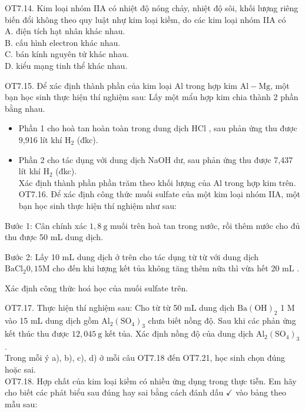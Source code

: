 \documentclass[10pt]{article}
\begin{document}
OT7.14. Kim loại nhóm IIA có nhiệt độ nóng chảy, nhiệt độ sôi, khối lượng riêng biến đổi không theo quy luật nhự kim loại kiềm, do các kim loại nhóm IIA có\\
A. điện tích hạt nhân khác nhau.\\
B. cấu hình electron khác nhau.\\
C. bán kính nguyên tử khác nhau.\\
D. kiểu mạng tinh thể khác nhau.

OT7.15. Để xác định thành phần của kim loại Al trong hợp kim $\mathrm{Al}-\mathrm{Mg}$, một bạn học sinh thực hiện thí nghiệm sau: Lấy một mẩu hợp kim chia thành 2 phần bằng nhau.

\begin{itemize}
  \item Phần 1 cho hoà tan hoàn toàn trong dung dịch HCl , sau phản ứng thu được 9,916 lít khí $\mathrm{H}_{2}$ (đkc).
  \item Phần 2 cho tác dụng với dung dịch NaOH dư, sau phản ứng thu được 7,437 lít khí $\mathrm{H}_{2}$ (đkc).\\
Xác định thành phần phần trăm theo khối lượng của Al trong hợp kim trên.\\
OT7.16. Để xác định công thức muối sulfate của một kim loại nhóm IIA, một bạn học sinh thực hiện thí nghiệm như sau:
\end{itemize}

Bước 1: Cân chính xác $1,8 \mathrm{~g}$ muối trên hoà tan trong nước, rồi thêm nước cho đủ thu được 50 mL dung dịch.

Bước 2: Lấy 10 mL dung dịch ở trên cho tác dụng từ từ với dung dịch $\mathrm{BaCl}_{2} 0,15 \mathrm{M}$ cho đến khi lượng kết tủa không tăng thêm nữa thì vừa hết 20 mL .

Xác định công thức hoá học của muối sulfate trên.

OT7.17. Thực hiện thí nghiệm sau: Cho từ từ 50 mL dung dịch $\mathrm{Ba}(\mathrm{OH})_{2}$ 1 M vào 15 mL dung dịch gồm $\mathrm{Al}_{2}\left(\mathrm{SO}_{4}\right)_{3}$ chưa biết nồng độ. Sau khi các phản ứng kết thúc thu được $12,045 \mathrm{~g}$ kết tủa. Xác định nồng độ của dung dịch $\mathrm{Al}_{2}\left(\mathrm{SO}_{4}\right)_{3}$.\\
Trong mỗi ý a), b), c), d) ở mỗi câu OT7.18 đến OT7.21, học sinh chọn đúng hoặc sai.\\
OT7.18. Hợp chất của kim loại kiềm có nhiều ứng dụng trong thực tiễn. Em hãy cho biết các phát biểu sau đúng hay sai bằng cách đánh dấu $\checkmark$ vào bảng theo mẫu sau:
\end{document}
